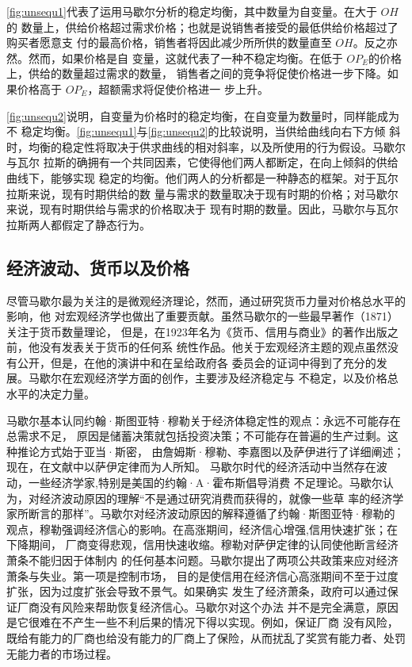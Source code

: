 \cref{fig:unsequ1}代表了运用马歇尔分析的稳定均衡，其中数量为自变量。在大于 $OH$的
数量上，供给价格超过需求价格；也就是说销售者接受的最低供给价格超过了购买者愿意支
付的最高价格，销售者将因此减少所所供的数量直至 $OH$。反之亦然。然而，如果价格是自
变量，这就代表了一种不稳定均衡。在低于 $OP_E$的价格上，供给的数量超过需求的数量，
销售者之间的竞争将促使价格进一步下降。如果价格高于 $OP_E$，超额需求将促使价格进一
步上升。

\cref{fig:unsequ2}说明，自变量为价格时的稳定均衡，在自变量为数量时，同样能成为不
稳定均衡。\cref{fig:unsequ1}与\cref{fig:unsequ2}的比较说明，当供给曲线向右下方倾
斜时，均衡的稳定性将取决于供求曲线的相对斜率，以及所使用的行为假设。马歇尔与瓦尔
拉斯的确拥有一个共同因素，它使得他们两人都断定，在向上倾斜的供给曲线下，能够实现
稳定的均衡。他们两人的分析都是一种静态的框架。对于瓦尔拉斯来说，现有时期供给的数
量与需求的数量取决于现有时期的价格；对马歇尔来说，现有时期供给与需求的价格取决于
现有时期的数量。因此，马歇尔与瓦尔拉斯两人都假定了静态行为。

\subsection{经济波动、货币以及价格}

尽管马歇尔最为关注的是微观经济理论，然而，通过研究货币力量对价格总水平的影响，他
对宏观经济学也做出了重要贡献。虽然马歇尔的一些最早著作（1871）关注于货币数量理论，
但是，在1923年名为《货币、信用与商业》的著作出版之前，他没有发表关于货币的任何系
统性作品。他关于宏观经济主题的观点虽然没有公开，但是，在他的演讲中和在呈给政府各
委员会的证词中得到了充分的发展。马歇尔在宏观经济学方面的创作，主要涉及经济稳定与
不稳定，以及价格总水平的决定力量。

马歇尔基本认同约翰·斯图亚特·穆勒关于经济体稳定性的观点：永远不可能存在总需求不足，
原因是储蓄决策就包括投资决策；不可能存在普遍的生产过剩。这种推论方式始于亚当·斯密，
由詹姆斯·穆勒、李嘉图以及萨伊进行了详细阐述；现在，在文献中以萨伊定律而为人所知。
马歇尔时代的经济活动中当然存在波动，一些经济学家,特别是美国的约翰·A·霍布斯倡导消费
不足理论。马歇尔认为，对经济波动原因的理解“不是通过研究消费而获得的，就像一些草
率的经济学家所断言的那样”。马歇尔对经济波动原因的解释遵循了约翰·斯图亚特·穆勒的
观点，穆勒强调经济信心的影响。在高涨期间，经济信心增强,信用快速扩张；在下降期间，
厂商变得悲观，信用快速收缩。穆勒对萨伊定律的认同使他断言经济萧条不能归因于体制内
的任何基本问题。马歇尔提出了两项公共政策来应对经济萧条与失业。第一项是控制市场，
目的是使信用在经济信心高涨期间不至于过度扩张，因为过度扩张会导致不景气。如果确实
发生了经济萧条，政府可以通过保证厂商没有风险来帮助恢复经济信心。马歇尔对这个办法
并不是完全满意，原因是它很难在不产生一些不利后果的情况下得以实现。例如，保证厂商
没有风险，既给有能力的厂商也给没有能力的厂商上了保险，从而扰乱了奖赏有能力者、处罚
无能力者的市场过程。


